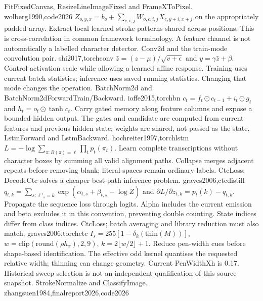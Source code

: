 {FitFixedCanvas, ResizeLineImageFixed and FrameXToPixel.}
{wolberg1990,code2026}
{$Z_{o,y,x}=b_o+\sum_{c,i,j}W_{o,c,i,j}X_{c,y+i,x+j}$ on the appropriately padded array.}
{Extract local learned stroke patterns shared across positions. This is
cross-correlation in common framework terminology. A feature channel is not
automatically a labelled character detector.}
{Conv2d and the train-mode convolution pair.}
{shi2017,torchconv}
{$\hat z=(z-\mu)/\sqrt{v+\epsilon}$ and $y=\gamma\hat z+\beta$.}
{Control activation scale while allowing a learned affine response. Training
uses current batch statistics; inference uses saved running statistics.
Changing that mode changes the operation.}
{BatchNorm2d and BatchNorm2dForwardTrain/Backward.}
{ioffe2015,torchbn}
{$c_t=f_t\odot c_{t-1}+i_t\odot g_t$ and $h_t=o_t\odot\tanh c_t$.}
{Carry gated memory along feature columns and expose a bounded hidden output.
The gates and candidate are computed from current features and previous
hidden state; weights are shared, not passed as the state.}
{LstmForward and LstmBackward.}
{hochreiter1997,torchlstm}
{$L=-\log\sum_{\pi:B(\pi)=\ell}\prod_t p_t(\pi_t)$.}
{Learn complete transcriptions without character boxes by summing all valid
alignment paths. Collapse merges adjacent repeats before removing blank;
literal spaces remain ordinary labels.}
{CtcLoss; DecodeCtc solves a cheaper best-path inference problem.}
{graves2006,ctcdistill}
{$q_{t,k}=\sum_{s:\ell'_s=k}\exp(\alpha_{t,s}+\beta_{t,s}-\log Z)$ and
$\partial L/\partial z_{t,k}=p_t(k)-q_{t,k}$.}
{Propagate the sequence loss through logits. Alpha includes the current
emission and beta excludes it in this convention, preventing double counting.
State indices differ from class indices.}
{CtcLoss; batch averaging and library reduction must also match.}
{graves2006,torchctc}
{$I_s=255[1-\delta_k(\mathrm{thin}(M))]$,
$w=\mathrm{clip}(\mathrm{round}(\rho h_x),2,9)$,
$k=2\lfloor w/2\rfloor+1$.}
{Reduce pen-width cues before shape-based identification. The effective odd
kernel quantises the requested relative width; thinning can change geometry.
Current PenWidthXh is 0.17. Historical sweep selection is not an independent
qualification of this source snapshot.}
{StrokeNormalize and ClassifyImage.}
{zhangsuen1984,finalreport2026,code2026}

